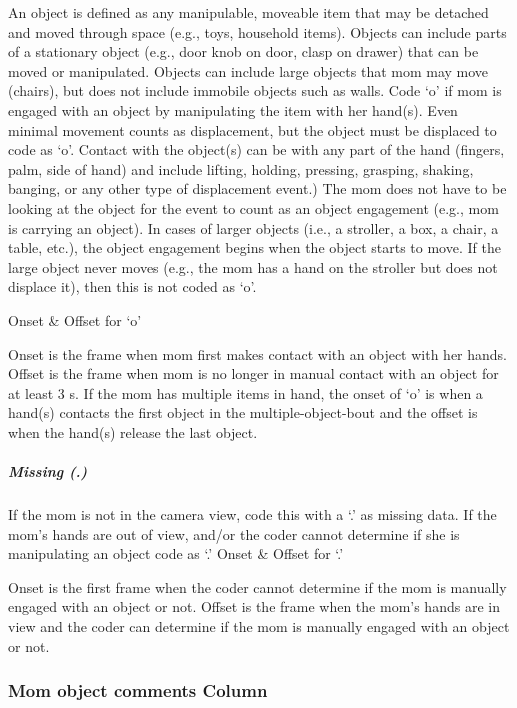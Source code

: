 \documentclass[
  12pt,
]{book}
\begin{document}
An object is defined as any manipulable, moveable item that may be detached and moved through space (e.g., toys, household items). Objects can include parts of a stationary object (e.g., door knob on door, clasp on drawer) that can be moved or manipulated. Objects can include large objects that mom may move (chairs), but does not include immobile objects such as walls. Code `o' if mom is engaged with an object by manipulating the item with her hand(s). Even minimal movement counts as displacement, but the object must be displaced to code as `o'. Contact with the object(s) can be with any part of the hand (fingers, palm, side of hand) and include lifting, holding, pressing, grasping, shaking, banging, or any other type of displacement event.) The mom does not have to be looking at the object for the event to count as an object engagement (e.g., mom is carrying an object).
In cases of larger objects (i.e., a stroller, a box, a chair, a table, etc.), the object engagement begins when the object starts to move. If the large object never moves (e.g., the mom has a hand on the stroller but does not displace it), then this is not coded as `o'.

Onset \& Offset for `o'

Onset is the frame when mom first makes contact with an object with her hands.
Offset is the frame when mom is no longer in manual contact with an object for at least 3 s. If the mom has multiple items in hand, the onset of `o' is when a hand(s) contacts the first object in the multiple-object-bout and the offset is when the hand(s) release the last object.

\hypertarget{mom_hands_off_camera}{%
\subparagraph*{Missing (.)}\label{mom_hands_off_camera}}

If the mom is not in the camera view, code this with a `.' as missing data. If the mom's hands are out of view, and/or the coder cannot determine if she is manipulating an object code as `.'
Onset \& Offset for `.'

Onset is the first frame when the coder cannot determine if the mom is manually engaged with an object or not.
Offset is the frame when the mom's hands are in view and the coder can determine if the mom is manually engaged with an object or not.

\hypertarget{mom-object-comments-column}{%
\subsubsection*{Mom object comments Column}\label{mom-object-comments-column}}
\end{document}
